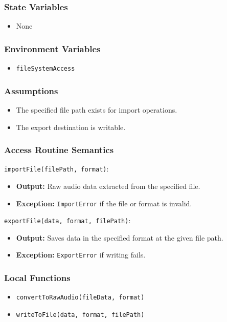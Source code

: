 \documentclass[12pt, titlepage]{article}
\begin{document}
\subsubsection{State Variables}  
\begin{itemize}  
    \item None  
\end{itemize}  

\subsubsection{Environment Variables}  
\begin{itemize}  
    \item \texttt{fileSystemAccess}  
\end{itemize}  

\subsubsection{Assumptions}  
\begin{itemize}  
    \item The specified file path exists for import operations.  
    \item The export destination is writable.  
\end{itemize}  

\subsubsection{Access Routine Semantics}  

\noindent \texttt{importFile(filePath, format)}:
\begin{itemize}  
    \item \textbf{Output:} Raw audio data extracted from the specified file.  
    \item \textbf{Exception:} \texttt{ImportError} if the file or format is invalid.  
\end{itemize}  

\noindent \texttt{exportFile(data, format, filePath)}:
\begin{itemize}  
    \item \textbf{Output:} Saves data in the specified format at the given file path.  
    \item \textbf{Exception:} \texttt{ExportError} if writing fails.  
\end{itemize}  

\subsubsection{Local Functions}  
\begin{itemize}  
    \item \texttt{convertToRawAudio(fileData, format)}  
    \item \texttt{writeToFile(data, format, filePath)}  
\end{itemize}  
\end{document}
